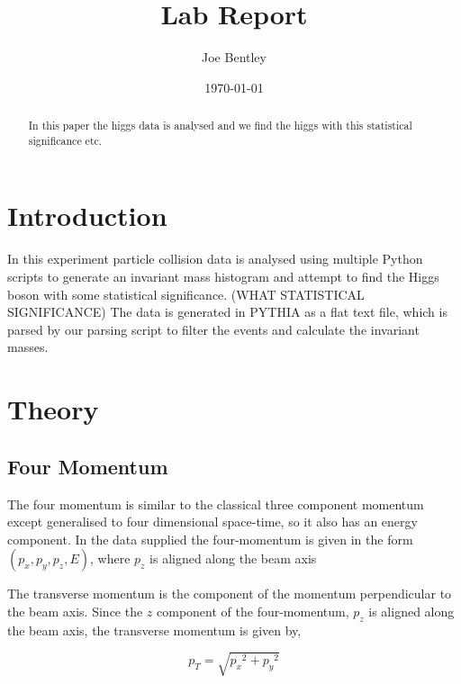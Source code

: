 \documentclass[11pt]{amsart}
\title{Lab Report}
\author{Joe Bentley}
\date{\today}
\begin{document}
\begin{abstract}
  In this paper the higgs data is analysed and we find the higgs with this statistical significance etc.
\end{abstract}

\maketitle

\newpage

\pagestyle{fancyplain}


\begin{multicols}{2}

\section{Introduction}

In this experiment particle collision data is analysed using multiple Python scripts to generate an invariant mass histogram and attempt to find the Higgs boson with some statistical significance. (WHAT STATISTICAL SIGNIFICANCE) The data is generated in PYTHIA as a flat text file, which is parsed by our parsing script to filter the events and calculate the invariant masses.

\section{Theory}

\subsection{Four Momentum}
\label{sec:fourmomentum}

The four momentum is similar to the classical three component momentum except generalised to four dimensional space-time, so it also has an energy component. \cite{kinematics} In the data supplied the four-momentum is given in the form $(p_x, p_y, p_z, E)$, where $p_z$ is aligned along the beam axis

The transverse momentum is the component of the momentum perpendicular to the beam axis. Since the $z$ component of the four-momentum, $p_z$ is aligned along the beam axis, the transverse momentum is given by,

\begin{equation}
  \label{eq:transverse}
  p_T = \sqrt{{p_x}^2 + {p_y}^2}
\end{equation}


\end{multicols}
\end{document}

